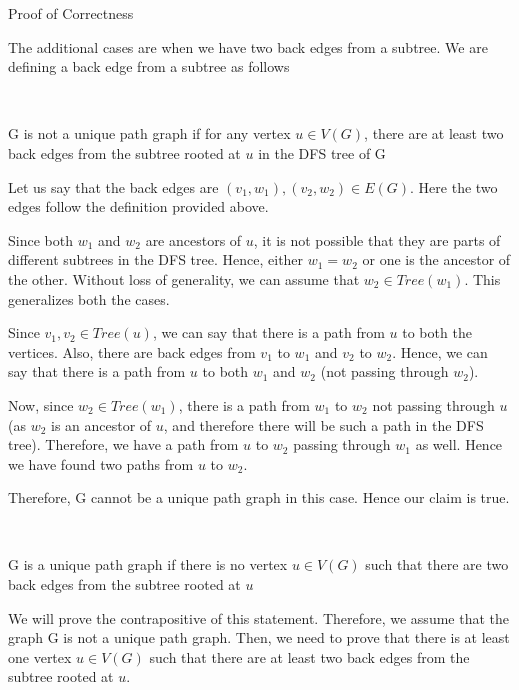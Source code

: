 \documentclass{article}
\begin{document}
\begin{question}
\begin{qsection}{Proof of Correctness}
		 \br\

		The additional cases are when we have two back edges from a subtree. We are defining a back edge from a subtree as follows \sbr\

		 \br\

		\begin{qproof}{G is not a unique path graph if for any vertex $u \in V(G)$, there are at least two back edges from the subtree rooted at $u$ in the DFS tree of G}
			
			Let us say that the back edges are $(v_1, w_1), (v_2, w_2) \in E(G)$. Here the two edges follow the definition provided above. \br\

			Since both $w_1$ and $w_2$ are ancestors of $u$, it is not possible that they are parts of different subtrees in the DFS tree. Hence, either $w_1 = w_2$ or one is the ancestor of the other. Without loss of generality, we can assume that $w_2 \in Tree(w_1)$. This generalizes both the cases. \br\

			Since $v_1, v_2 \in Tree(u)$, we can say that there is a path from $u$ to both the vertices. Also, there are back edges from $v_1$ to $w_1$ and $v_2$ to $w_2$. Hence, we can say that there is a path from $u$ to both $w_1$ and $w_2$ (not passing through $w_2$).

			Now, since $w_2 \in Tree(w_1)$, there is a path from $w_1$ to $w_2$ not passing through $u$ (as $w_2$ is an ancestor of $u$, and therefore there will be such a path in the DFS tree). Therefore, we have a path from $u$ to $w_2$ passing through $w_1$ as well. Hence we have found two paths from $u$ to $w_2$.

			Therefore, G cannot be a unique path graph in this case. Hence our claim is true.

		\end{qproof}

		 \br\

		\begin{qproof}{G is a unique path graph if there is no vertex $u \in V(G)$ such that there are two back edges from the subtree rooted at $u$}

			We will prove the contrapositive of this statement. Therefore, we assume that the graph G is not a unique path graph. Then, we need to prove that there is at least one vertex $u \in V(G)$ such that there are at least two back edges from the subtree rooted at $u$. \br\


\end{qproof}
\end{qsection}
\end{question}
\end{document}
